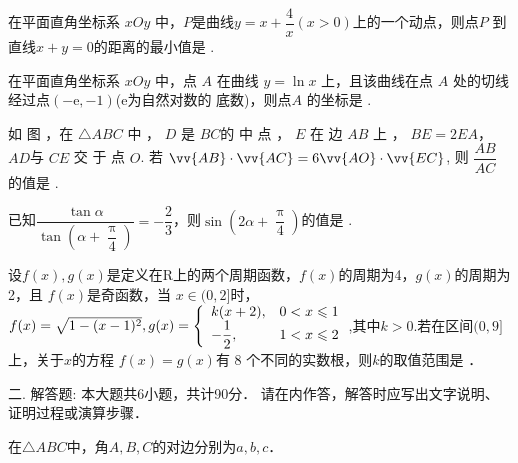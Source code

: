 \documentclass[no-math,twoside]{exam}  %
\newcommand{\heiti}{\CJKfontspec{STHeitiSC-Light}}%
\renewcommand{\solutiontitle}{{\bfseries 答案：}}
\begin{document}
\begin{questions}
\question
	在平面直角坐标系 $xOy$ 中，$ P $是曲线$y = x + \dfrac { 4 } { x } ( x > 0 )$上的一个动点，则点$ P$ 到直线$ x + y =0 $的距离的最小值是
\underline {\hspace{3cm}}. 

\question
在平面直角坐标系 $xOy$ 中，点 $A$ 在曲线 $y=\ln  x$ 上，且该曲线在点 $A$ 处的切线经过点$ (-\mathrm{e},-1)$($\mathrm{e}$为自然对数的 底数)，则点$ A$ 的坐标是
\underline {\hspace{3cm}}. 

\question
如 图 ，在 $\triangle{ A B C}$ 中 ， $D$ 是 $B C $的 中 点 ， $E$ 在 边 $A B$ 上 ， $B E = 2 E A $， $A D $与 $C E$ 交 于 点 $O $. 若 $\vv{A B }\cdot\vv{ A C }=6\vv{ A O }\cdot\vv{ E C} $, 则 $\dfrac{AB}{AC}$ 的值是
\underline {\hspace{3cm}}. 

\question
已知$\dfrac { \tan \alpha } { \tan \left( \alpha + \dfrac { \uppi } { 4 } \right) } = - \dfrac { 2 } { 3 }$，则$\sin \left( 2 \alpha + \dfrac { \uppi } { 4 } \right)$的值是
\underline {\hspace{3cm}}. 

\question
	设$f ( x ) , g ( x )$是定义在R上的两个周期函数，$f ( x )$的周期为4，$g( x )$的周期为2，且 $f ( x )$是奇函数，当 $x \in ( 0,2 ]$时，$f ( x ) = \sqrt { 1 - ( x - 1 ) ^ { 2 } } , g ( x ) = \left\{ \begin{array} { l l } { k ( x + 2 ) , } & { 0 < x \leqslant 1 } \\ { - \dfrac { 1 } { 2 } , } & { 1 < x \leqslant 2 } \end{array} \right.$,其中$k>0$.若在区间$( 0,9 ]$上，关于$x$的方程 $f ( x ) = g ( x )$有 8 个不同的实数根，则$k $的取值范围是
\underline {\hspace{3cm}}．


\item[\heiti 二.] {\heiti 解答题: 本大题共6小题，共计90分． 请在内作答，解答时应写出文字说明、证明过程或演算步骤．}
\renewcommand{\solutiontitle}{{\bfseries 解: }}


	在$\triangle{ABC}$中，角$A,B,C$的对边分别为$a,b,c$．
		
\vfill


\end{questions}
\end{document}
